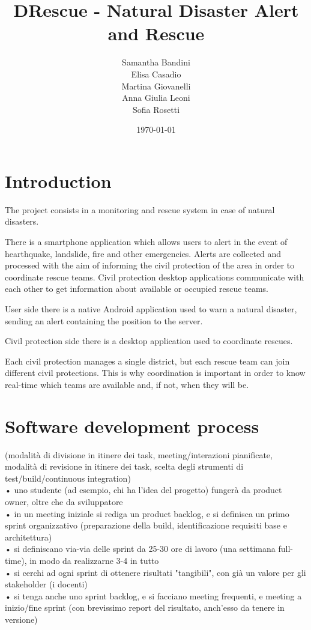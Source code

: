 \documentclass[a4paper,12pt]{report}
\title{DRescue - Natural Disaster Alert and Rescue}
\author{Samantha Bandini\\Elisa Casadio\\Martina Giovanelli\\Anna Giulia Leoni\\Sofia Rosetti}
\date{\today}
\begin{document}
\maketitle

\tableofcontents

\chapter{Introduction}

The project consists in a monitoring and rescue system in case of natural disasters. 

There is a smartphone application which allows users to alert in the event of hearthquake, landslide, fire and other emergencies.
Alerts are collected and processed with the aim of informing the civil protection of the area in order to coordinate rescue teams.
Civil protection desktop applications communicate with each other to get information about available or occupied rescue teams.

User side there is a native Android application used to warn a natural disaster, sending an alert containing the position to the server.

Civil protection side there is a desktop application used to coordinate rescues.

Each civil protection manages a single district, but each rescue team can join different civil protections. This is why coordination is important in order to know real-time which teams are available and, if not, when they will be.


\chapter{Software development process}

(modalità di divisione in itinere dei task, meeting/interazioni pianificate, modalità di revisione in itinere dei task, scelta degli strumenti di test/build/continuous integration)\\
•	uno studente (ad esempio, chi ha l'idea del progetto) fungerà da product owner, oltre che da sviluppatore\\
•	in un meeting iniziale si rediga un product backlog, e si definisca un primo sprint organizzativo (preparazione della build, identificazione requisiti base e architettura)\\
•	si definiscano via-via delle sprint da 25-30 ore di lavoro (una settimana full-time), in modo da realizzarne 3-4 in tutto\\
•	si cerchi ad ogni sprint di ottenere risultati "tangibili", con già un valore per gli stakeholder (i docenti)\\
•	si tenga anche uno sprint backlog, e si facciano meeting frequenti, e meeting a inizio/fine sprint (con brevissimo report del risultato, anch'esso da tenere in versione)\\
\end{document}
